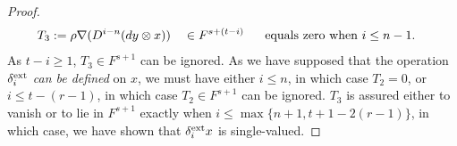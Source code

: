 \documentclass[11pt]{amsart} \renewcommand{\baselinestretch}{1.2}
\theoremstyle{plain}
\numberwithin{equation}{section} %
\theoremstyle{plain}
\numberwithin{equation}{chapter} %
\newcommand{\twist}{\omega}
\newcommand{\Nabla}{\nabla}
\begin{document}
\begin{second quadrant homotopy sseq operations}
\begin{proof}
\begin{alignat*}{3}
T_3:={}&\rho\Nabla(D^{i-n}(dy\otimes x))&&\in F^{s+(t-i)}&&\textup{\ \ equals zero when }i\leq n-1.
\end{alignat*}
As $t-i\geq1$, $T_3\in F^{s+1}$ can be ignored. As we have supposed that the operation $\delta^\textup{ext}_i$ \emph{can be defined} on $x$, we must have either $i\leq n$, in which case $T_2=0$, or $i\leq t-(r-1)$, in which case $T_2\in F^{s+1}$ can be ignored. $T_3$ is assured either to vanish or to lie in $F^{s+1}$ exactly when $i\leq \max\{n+1,t+1-2(r-1)\}$, in which case, we have shown that $\delta^\textup{ext}_ix$ is single-valued.



\end{proof}
\end{second quadrant homotopy sseq operations}
\end{document}
